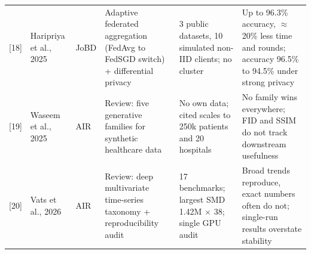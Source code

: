 \documentclass[pdflatex,sn-basic,Numbered]{sn-jnl}%
\begin{document}
{\begin{xltabular}{\textwidth}{@{}p{0.8cm} p{2.0cm} p{1.0cm} p{2.2cm} p{2.2cm} p{1.9cm}@{}}
{[18]} & Haripriya et al., 2025 & JoBD & Adaptive federated aggregation (FedAvg to FedSGD switch) + differential privacy & 3 public datasets, 10 simulated non-IID clients; no cluster & Up to 96.3\% accuracy, $\approx$20\% less time and rounds; accuracy 96.5\% to 94.5\% under strong privacy \\
{[19]} & Waseem et al., 2025 & AIR & Review: five generative families for synthetic healthcare data & No own data; cited scales to 250k patients and 20 hospitals & No family wins everywhere; FID and SSIM do not track downstream usefulness \\
{[20]} & Vats et al., 2026 & AIR & Review: deep multivariate time-series taxonomy + reproducibility audit & 17 benchmarks; largest SMD 1.42M $\times$ 38; single GPU audit & Broad trends reproduce, exact numbers often do not; single-run results overstate stability \\
\end{xltabular}
}

\end{document}

